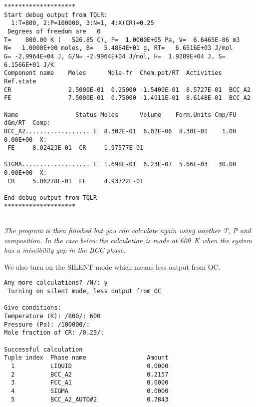 \documentclass[12pt]{article}
\begin{document}
{\small
\begin{verbatim}
********************
Start debug output from TQLR:
  1:T=800, 2:P=100000, 3:N=1, 4:X(CR)=0.25
 Degrees of freedom are   0
T=    800.00 K (   526.85 C), P=  1.0000E+05 Pa, V=  6.6465E-06 m3
N=   1.0000E+00 moles, B=   5.4884E+01 g, RT=   6.6516E+03 J/mol
G= -2.9964E+04 J, G/N= -2.9964E+04 J/mol, H=  1.9289E+04 J, S=  6.1566E+01 J/K
Component name    Moles      Mole-fr  Chem.pot/RT  Activities  Ref.state
CR                2.5000E-01  0.25000 -1.5400E-01  8.5727E-01  BCC_A2
FE                7.5000E-01  0.75000 -1.4911E-01  8.6148E-01  BCC_A2

Name                Status Moles      Volume    Form.Units Cmp/FU dGm/RT  Comp:
BCC_A2.................. E  8.302E-01  6.02E-06  8.30E-01    1.00  0.00E+00  X:
 FE     8.02423E-01  CR     1.97577E-01

SIGMA................... E  1.698E-01  6.23E-07  5.66E-03   30.00  0.00E+00  X:
 CR     5.06278E-01  FE     4.93722E-01

End debug output from TQLR
********************


\end{verbatim}
}

{\em The program is then finished but you can calculate again using
another T, P and composition.  In the case below the calculation is made
at 600~K when the system has a miscibility gap in the BCC phase.

We also turn on the SILENT mode which means less output from OC.}

{\small
\begin{verbatim}
Any more calculations? /N/: y
 Turning on silent mode, less output from OC

Give conditions:
Temperature (K): /800/: 600
Pressure (Pa): /100000/:
Mole fraction of CR: /0.25/:

Successful calculation
Tuple index  Phase name                 Amount
  1          LIQUID                     0.0000
  2          BCC_A2                     0.2157
  3          FCC_A1                     0.0000
  4          SIGMA                      0.0000
  5          BCC_A2_AUTO#2              0.7843

\end{verbatim}
}
\end{document}

